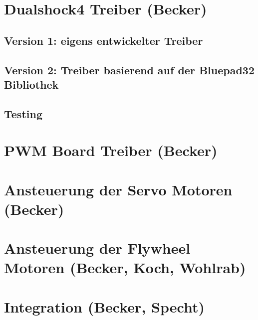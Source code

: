 \section{Dualshock4 Treiber (Becker)}

\subsection{Version 1: eigens entwickelter Treiber}

\subsection{Version 2: Treiber basierend auf der Bluepad32 Bibliothek}

\subsection{Testing}

\section{PWM Board Treiber (Becker)}

\section{Ansteuerung der Servo Motoren (Becker)}

\section{Ansteuerung der Flywheel Motoren (Becker, Koch, Wohlrab)}

\section{Integration (Becker, Specht)}